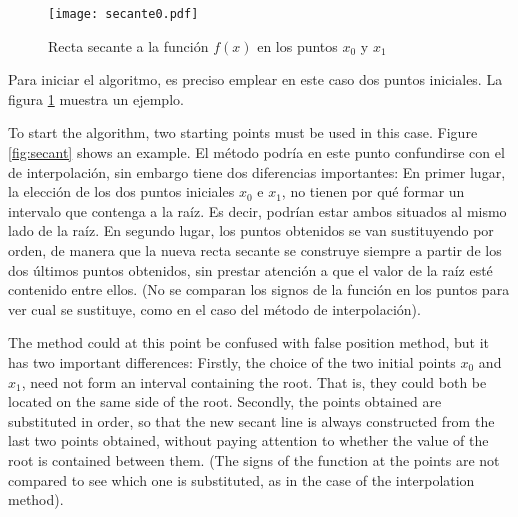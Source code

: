 \begin{figure}[h]
\texttt{[image: secante0.pdf]}
\caption{Recta secante a la  función $f(x)$ en los puntos $x_0$ y $x_1$}
\label{fig:secante}
\end{figure}

\begin{paracol}{2}
Para iniciar el algoritmo, es preciso emplear en este caso dos puntos iniciales. La figura \ref{fig:secante} muestra un ejemplo.

    \switchcolumn
    To start the algorithm, two starting points must be used in this case. Figure \ref{fig:secant} shows an example.
\switchcolumn
El método podría en este punto confundirse con el de interpolación, sin embargo tiene dos diferencias importantes: En primer lugar, la elección de los dos puntos iniciales $x_0$ e $x_1$, no tienen por qué formar un intervalo que contenga a la raíz. Es decir, podrían estar ambos situados al mismo lado de la raíz. En segundo lugar, los puntos obtenidos se van sustituyendo por orden, de manera que la nueva recta secante se construye siempre a partir de los dos últimos puntos obtenidos, sin prestar atención a que el valor de la raíz esté contenido entre ellos. (No se comparan los signos de la función en los puntos para ver cual se sustituye, como en el caso del método de interpolación). 

\switchcolumn
The method could at this point be confused with false position method, but it has two important differences: Firstly, the choice of the two initial points $x_0$ and $x_1$, need not form an interval containing the root. That is, they could both be located on the same side of the root. Secondly, the points obtained are substituted in order, so that the new secant line is always constructed from the last two points obtained, without paying attention to whether the value of the root is contained between them. (The signs of the function at the points are not compared to see which one is substituted, as in the case of the interpolation method). 

\end{paracol}

